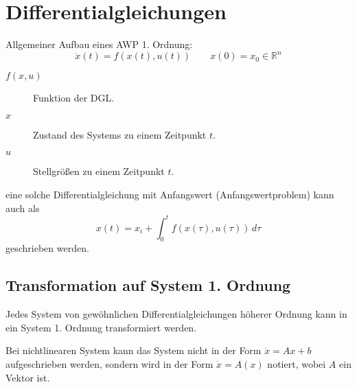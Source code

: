 \documentclass[a4paper, 11pt, accentcolor = tud3b]{tudreport}
\begin{document}
        \section{Differentialgleichungen} %
	        Allgemeiner Aufbau eines AWP 1. Ordnung:
	        \begin{equation*}
		        \dot{x}(t) = f(x(t), u(t)) \quad\quad x(0) = x _ 0 \in \mathbb{R} ^ n
	        \end{equation*}
	        \begin{description}
	        	\item[\( f(x, u) \)] Funktion der DGL.
	        	\item[\( x \)] Zustand des Systems zu einem Zeitpunkt \( t \).
	        	\item[\( u \)] Stellgrößen zu einem Zeitpunkt \( t \).
	        \end{description}
	        
	        eine solche Differentialgleichung mit Anfangswert (Anfangswertproblem) kann auch als
	        \begin{equation*}
		        x(t) = x _ i + \int_{0}^{t} \! f(x(\tau), u(\tau)) \, d\!\tau
	        \end{equation*}
	        geschrieben werden.
        
            \subsection{Transformation auf System 1. Ordnung} %
                Jedes System von gewöhnlichen Differentialgleichungen höherer Ordnung kann in ein System 1. Ordnung transformiert werden.
                
                Bei nichtlinearen System kann das System nicht in der Form \( \dot{x} = Ax + b \) aufgeschrieben werden, sondern wird in der Form \( \dot{x} = A(x) \) notiert, wobei \( A \) ein Vektor ist.
                
\end{document}
